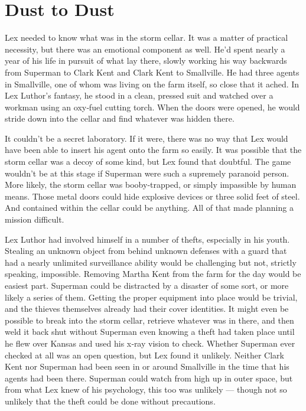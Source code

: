 \hypertarget{dust-to-dust}{%
\chapter{Dust to Dust}\label{dust-to-dust}}

Lex needed to know what was in the storm cellar. It was a matter of
practical necessity, but there was an emotional component as well. He'd
spent nearly a year of his life in pursuit of what lay there, slowly
working his way backwards from Superman to Clark Kent and Clark Kent to
Smallville. He had three agents in Smallville, one of whom was living on
the farm itself, so close that it ached. In Lex Luthor's fantasy, he
stood in a clean, pressed suit and watched over a workman using an
oxy‐fuel cutting torch. When the doors were opened, he would stride down
into the cellar and find whatever was hidden there.

It couldn't be a secret laboratory. If it were, there was no way that
Lex would have been able to insert his agent onto the farm so easily. It
was possible that the storm cellar was a decoy of some kind, but Lex
found that doubtful. The game wouldn't be at this stage if Superman were
such a supremely paranoid person. More likely, the storm cellar was
booby‐trapped, or simply impassible by human means. Those metal doors
could hide explosive devices or three solid feet of steel. And contained
within the cellar could be anything. All of that made planning a mission
difficult.

Lex Luthor had involved himself in a number of thefts, especially in his
youth. Stealing an unknown object from behind unknown defenses with a
guard that had a nearly unlimited surveillance ability would be
challenging but not, strictly speaking, impossible. Removing Martha Kent
from the farm for the day would be easiest part. Superman could be
distracted by a disaster of some sort, or more likely a series of them.
Getting the proper equipment into place would be trivial, and the
thieves themselves already had their cover identities. It might even be
possible to break into the storm cellar, retrieve whatever was in there,
and then weld it back shut without Superman even knowing a theft had
taken place until he flew over Kansas and used his x‐ray vision to
check. Whether Superman ever checked at all was an open question, but
Lex found it unlikely. Neither Clark Kent nor Superman had been seen in
or around Smallville in the time that his agents had been there.
Superman could watch from high up in outer space, but from what Lex knew
of his psychology, this too was unlikely --- though not so unlikely that
the theft could be done without precautions.

